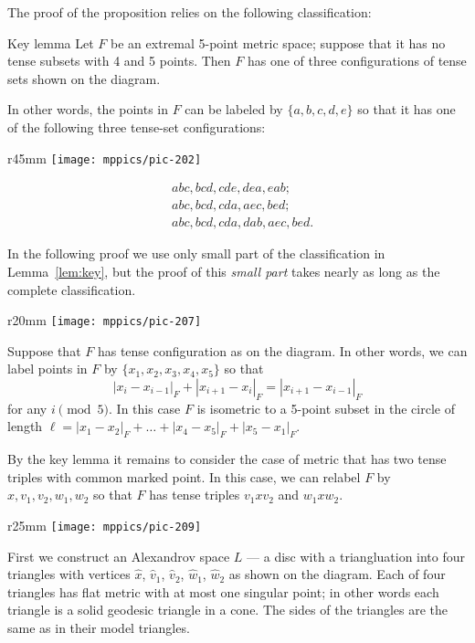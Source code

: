 \documentclass{article}
\begin{document}
The proof of the proposition relies on the following classification:

\begin{thm}{Key lemma}\label{lem:key}
Let $F$ be an extremal 5-point metric space; suppose that it has no tense subsets with 4 and 5 points.
Then $F$ has one of three configurations of tense sets shown on the diagram.

In other words, the points in $F$ can be labeled by $\{a,b,c,d,e\}$ so that it has
one of the following three tense-set configurations:

\begin{wrapfigure}{r}{45mm}
\vskip3mm
\centering
\texttt{[image: mppics/pic-202]}
\end{wrapfigure}
\vskip-6mm
\begin{align*}
&abc, bcd, cde, dea, eab;
\\
&abc, bcd, cda, aec, bed;
\\
&abc, bcd, cda, dab, aec, bed.
\end{align*}

\end{thm}

In the following proof we use only small part of the classification in Lemma~\ref{lem:key},
but the proof of this \emph{small part} takes nearly as long as the complete classification.

\begin{wrapfigure}{r}{20mm}
\vskip-0mm
\centering
\texttt{[image: mppics/pic-207]}
\end{wrapfigure}

Suppose that $F$ has tense configuration as on the diagram.
In other words, we can label points in $F$  by $\{x_1,x_2,x_3,x_4,x_5\}$ so that
\[|x_{i}-x_{i-1}|_F+|x_{i+1}-x_{i}|_F=|x_{i+1}-x_{i-1}|_F\]
for any $i\pmod 5$.
In this case $F$ is isometric to a 5-point subset in the circle of length 
$\ell=|x_1-x_2|_F+\dots+|x_4-x_5|_F+|x_5-x_1|_F$.

By the key lemma it remains to consider the case of metric that has two tense triples with common marked point.
In this case, we can relabel $F$ by $x,v_1,v_2,w_1,w_2$ so that $F$ has tense triples $v_1xv_2$ and $w_1xw_2$.

\begin{wrapfigure}{r}{25mm}
\vskip-4mm
\centering
\texttt{[image: mppics/pic-209]}
\end{wrapfigure}

First we construct an Alexandrov space $L$ --- a disc with a triangluation into four triangles with vertices $\hat x$, $\hat v_1$, $\hat v_2$, $\hat w_1$, $\hat w_2$ as shown on the diagram.
Each of four triangles has flat metric with at most one singular point;
in other words each triangle is a solid geodesic triangle in a cone.
The sides of the triangles are the same as in their model triangles.
\end{document}
